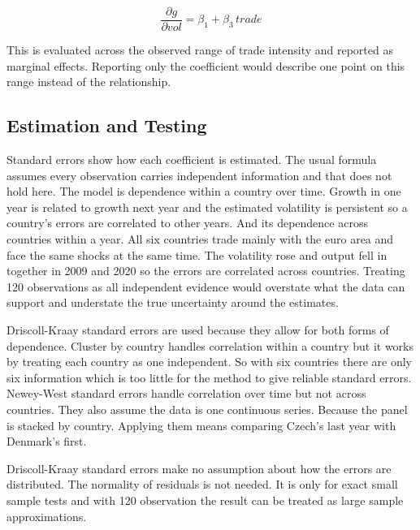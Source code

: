 \vspace{\baselineskip}

\begin{equation}\label{marg_ef}
\frac{\partial g}{\partial vol} = \beta_1 + \beta_3\, trade
\end{equation}

\vspace{\baselineskip}

This is evaluated across the observed range of trade intensity and reported as marginal effects.
Reporting only the coefficient would describe one point on this range instead of the relationship.

\subsection{Estimation and Testing}\label{inf}

Standard errors show how each coefficient is estimated.
The usual formula assumes every observation carries independent information and that does not hold here.
The model is dependence within a country over time.
Growth in one year is related to growth next year and the estimated volatility is persistent so a country's errors are correlated to other years.
And its dependence across countries within a year.
All six countries trade mainly with the euro area and face the same shocks at the same time.
The volatility rose and output fell in together in 2009 and 2020 so the errors are correlated across countries.
Treating 120 observations as all independent evidence would overstate what the data can support and understate the true uncertainty around the estimates.

\vspace{\baselineskip}

Driscoll-Kraay standard errors are used because they allow for both forms of dependence.
Cluster by country handles correlation within a country but it works by treating each country as one independent.
So with six countries there are only six information which is too little for the method to give reliable standard errors.
Newey-West standard errors handle correlation over time but not across countries.
They also assume the data is one continuous series.
Because the panel is stacked by country.
Applying them means comparing Czech's last year with Denmark's first.

\vspace{\baselineskip}

Driscoll-Kraay standard errors make no assumption about how the errors are distributed.
The normality of residuals is not needed.
It is only for exact small sample tests and with 120 observation the result can be treated as large sample approximations.

